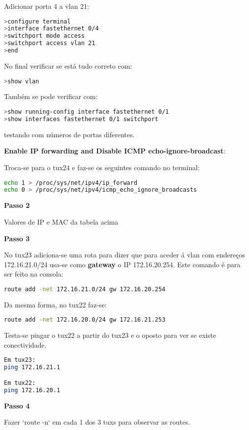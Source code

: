 Adicionar porta 4 a vlan 21:
\begin{lstlisting}[language=bash]
>configure terminal
>interface fastethernet 0/4             
>switchport mode access
>switchport access vlan 21
>end
\end{lstlisting}

No final verificar se está tudo correto com:
\begin{lstlisting}[language=bash]
>show vlan
\end{lstlisting}

Também se pode verificar com:
\begin{lstlisting}[language=bash]
>show running-config interface fastethernet 0/1
>show interfaces fastethernet 0/1 switchport
\end{lstlisting}
testando com números de portas diferentes.

\textbf{Enable IP forwarding and Disable ICMP echo-ignore-broadcast}:

Troca-se para o tux24 e faz-se os seguintes comando no terminal:
\begin{lstlisting}[language=bash]
echo 1 > /proc/sys/net/ipv4/ip_forward
echo 0 > /proc/sys/net/ipv4/icmp_echo_ignore_broadcasts
\end{lstlisting}


\textbf{Passo 2}

Valores de IP e MAC da tabela acima

\textbf{Passo 3}

No tux23 adiciona-se uma rota para dizer que para aceder á vlan com endereços 172.16.21.0/24 usa-se como \textbf{gateway} o IP 172.16.20.254. Este comando é para ser feito na consola:
\begin{lstlisting}[language=bash]
route add -net 172.16.21.0/24 gw 172.16.20.254
\end{lstlisting}
Da mesma forma, no tux22 faz-se:
\begin{lstlisting}[language=bash]
route add -net 172.16.20.0/24 gw 172.16.21.253
\end{lstlisting}

Testa-se pingar o tux22 a partir do tux23 e o oposto para ver se existe conectividade.
\begin{lstlisting}[language=bash]
Em tux23:
ping 172.16.21.1

Em tux22:
ping 172.16.20.1
\end{lstlisting}


\textbf{Passo 4}

Fazer `route -n` em cada 1 dos 3 tuxs para observar as routes.


